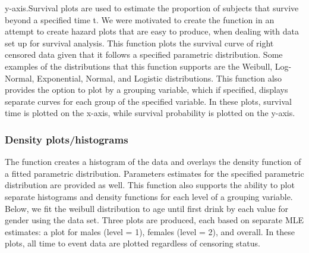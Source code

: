 {{{y-axis.}{Survival plots are used to estimate the proportion of subjects that survive beyond a specified time t. We were motivated to create the function  in an attempt to create hazard plots that are easy to produce, when dealing with data set up for survival analysis. This function plots the survival curve of right censored data given that it follows a specified parametric distribution. Some examples of the distributions that this function supports are the Weibull, Log-Normal, Exponential, Normal, and Logistic distributions. This function also provides the option to plot by a grouping variable, which if specified, displays separate curves for each group of the specified variable. In these plots, survival time is plotted on the x-axis, while survival probability is plotted on the y-axis.}}\label{survival-plots-are-used-to-estimate-the-proportion-of-subjects-that-survive-beyond-a-specified-time-t.-we-were-motivated-to-create-the-function-in-an-attempt-to-create-hazard-plots-that-are-easy-to-produce-when-dealing-with-data-set-up-for-survival-analysis.-this-function-plots-the-survival-curve-of-right-censored-data-given-that-it-follows-a-specified-parametric-distribution.-some-examples-of-the-distributions-that-this-function-supports-are-the-weibull-log-normal-exponential-normal-and-logistic-distributions.-this-function-also-provides-the-option-to-plot-by-a-grouping-variable-which-if-specified-displays-separate-curves-for-each-group-of-the-specified-variable.-in-these-plots-survival-time-is-plotted-on-the-x-axis-while-survival-probability-is-plotted-on-the-y-axis.}}

\hypertarget{density-plotshistograms-1}{%
\subsubsection{Density
plots/histograms}\label{density-plotshistograms-1}}

The  function creates a histogram of the data and
overlays the density function of a fitted parametric distribution.
Parameters estimates for the specified parametric distribution are
provided as well. This function also supports the ability to plot
separate histograms and density functions for each level of a grouping
variable. Below, we fit the weibull distribution to age until first
drink by each value for gender using the  data set.
Three plots are produced, each based on separate MLE estimates: a plot
for males (level = 1), females (level = 2), and overall. In these plots,
all time to event data are plotted regardless of censoring status.

